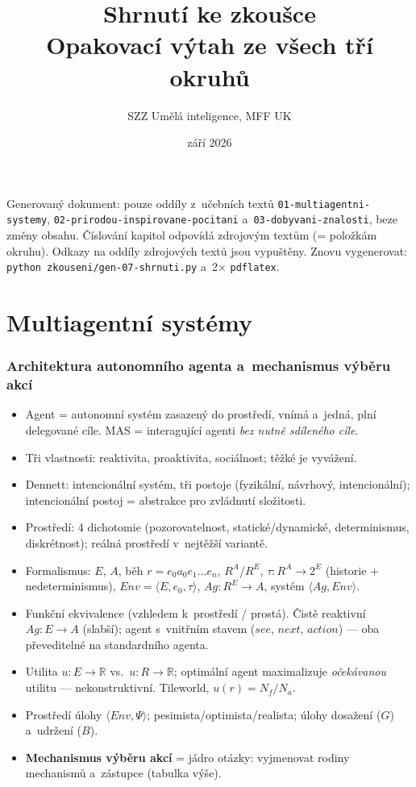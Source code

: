 \documentclass[11pt,a4paper]{article}
\title{\textbf{Shrnutí ke zkoušce}\\[0.3em]\large Opakovací výtah ze všech tří okruhů}
\author{SZZ Umělá inteligence, MFF UK}
\date{září 2026}
\theoremstyle{definition}
\begin{document}
\maketitle
\vspace{-1.5em}
\begin{center}
\begin{minipage}{0.93\textwidth}
\small
Generovaný dokument: pouze oddíly  z~učebních textů
\texttt{01-multiagentni-systemy}, \texttt{02-prirodou-inspirovane-pocitani}
a~\texttt{03-dobyvani-znalosti}, beze změny obsahu. Číslování kapitol odpovídá zdrojovým
textům (= položkám okruhu). Odkazy na oddíly zdrojových textů jsou vypuštěny.
Znovu vygenerovat: \texttt{python zkouseni/gen-07-shrnuti.py} a~2$\times$ \texttt{pdflatex}.
\end{minipage}
\end{center}
\tableofcontents
\newpage

\part{Multiagentní systémy}
\setcounter{section}{0}

\section{Architektura autonomního agenta a~mechanismus výběru akcí}
\begin{itemize}
\item Agent = autonomní systém zasazený do prostředí, vnímá a~jedná, plní delegované cíle.
 MAS = interagující agenti \emph{bez nutně sdíleného cíle}.
\item Tři vlastnosti: reaktivita, proaktivita, sociálnost; těžké je vyvážení.
\item Dennett: intencionální systém, tři postoje (fyzikální, návrhový, intencionální);
 intencionální postoj = abstrakce pro zvládnutí složitosti.
\item Prostředí: 4 dichotomie (pozorovatelnost, statické/dynamické, determinismus,
 diskrétnost); reálná prostředí v~nejtěžší variantě.
\item Formalismus: $E$, $A$, běh $r = e_0 a_0 e_1 \dots e_n$, $R^A$/$R^E$,
 $\tau : R^A \to 2^E$ (historie + nedeterminismus),
 $\mathit{Env}=\langle E,e_0,\tau\rangle$, $Ag : R^E \to A$, systém $\langle Ag,\mathit{Env}\rangle$.
\item Funkční ekvivalence (vzhledem k~prostředí / prostá). Čistě reaktivní $Ag: E \to A$
 (slabší); agent s~vnitřním stavem ($\mathit{see}$, $\mathit{next}$, $\mathit{action}$) ---
 oba převeditelné na standardního agenta.
\item Utilita $u : E \to \mathbb{R}$ vs.\ $u : R \to \mathbb{R}$; optimální agent maximalizuje
 \emph{očekávanou} utilitu --- nekonstruktivní. Tileworld, $u(r)=N_f/N_a$.
\item Prostředí úlohy $\langle \mathit{Env}, \Psi\rangle$; pesimista/optimista/realista;
 úlohy dosažení ($G$) a~udržení ($B$).
\item \textbf{Mechanismus výběru akcí} = jádro otázky: vyjmenovat rodiny mechanismů
 a~zástupce (tabulka výše).
\end{itemize}
\end{document}
